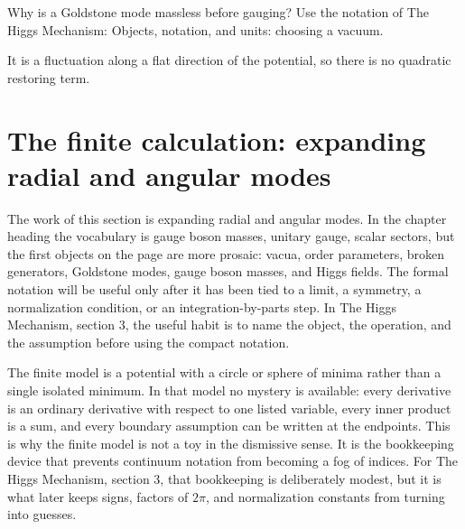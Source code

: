 \begin{exercise}
Why is a Goldstone mode massless before gauging?  Use the notation of The Higgs Mechanism: Objects, notation, and units: choosing a vacuum.
\begin{answer}
It is a fluctuation along a flat direction of the potential, so there is no quadratic restoring term.
\end{answer}
\end{exercise}



\section{The finite calculation: expanding radial and angular modes}













The work of this section is expanding radial and angular modes.  In the chapter heading the vocabulary is gauge boson masses, unitary gauge, scalar sectors, but the first objects on the page are more prosaic: vacua, order parameters, broken generators, Goldstone modes, gauge boson masses, and Higgs fields.  The formal notation will be useful only after it has been tied to a limit, a symmetry, a normalization condition, or an integration-by-parts step.  In The Higgs Mechanism, section 3, the useful habit is to name the object, the operation, and the assumption before using the compact notation.

The finite model is a potential with a circle or sphere of minima rather than a single isolated minimum.  In that model no mystery is available: every derivative is an ordinary derivative with respect to one listed variable, every inner product is a sum, and every boundary assumption can be written at the endpoints.  This is why the finite model is not a toy in the dismissive sense.  It is the bookkeeping device that prevents continuum notation from becoming a fog of indices.  For The Higgs Mechanism, section 3, that bookkeeping is deliberately modest, but it is what later keeps signs, factors of \(2\pi\), and normalization constants from turning into guesses.

